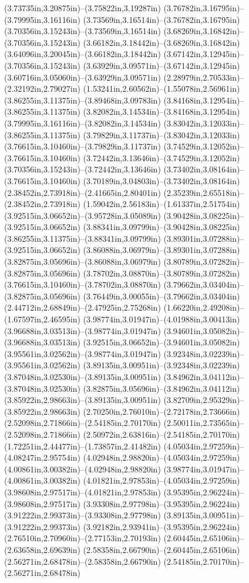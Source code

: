 (3.73735in,3.20875in)--(3.75822in,3.19287in) (3.76782in,3.16795in)--(3.79995in,3.16116in) (3.73569in,3.16514in)--(3.76782in,3.16795in) (3.70356in,3.15243in)--(3.73569in,3.16514in) (3.68269in,3.16842in)--(3.70356in,3.15243in) (3.66182in,3.18442in)--(3.68269in,3.16842in) (3.64096in,3.20045in)--(3.66182in,3.18442in) (3.67142in,3.12945in)--(3.70356in,3.15243in) (3.63929in,3.09571in)--(3.67142in,3.12945in) (3.60716in,3.05060in)--(3.63929in,3.09571in) (2.28979in,2.70533in)--(2.32192in,2.79027in) (1.53241in,2.60562in)--(1.55078in,2.56961in) (3.86255in,3.11375in)--(3.89468in,3.09783in) (3.84168in,3.12954in)--(3.86255in,3.11375in) (3.82082in,3.14534in)--(3.84168in,3.12954in) (3.79995in,3.16116in)--(3.82082in,3.14534in) (3.83042in,3.12033in)--(3.86255in,3.11375in) (3.79829in,3.11737in)--(3.83042in,3.12033in) (3.76615in,3.10460in)--(3.79829in,3.11737in) (3.74529in,3.12052in)--(3.76615in,3.10460in) (3.72442in,3.13646in)--(3.74529in,3.12052in) (3.70356in,3.15243in)--(3.72442in,3.13646in) (3.73402in,3.08164in)--(3.76615in,3.10460in) (3.70189in,3.04803in)--(3.73402in,3.08164in) (2.38452in,2.73918in)--(2.41665in,2.80401in) (2.35239in,2.65518in)--(2.38452in,2.73918in) (1.59042in,2.56183in)--(1.61337in,2.51754in) (3.92515in,3.06652in)--(3.95728in,3.05089in) (3.90428in,3.08225in)--(3.92515in,3.06652in) (3.88341in,3.09799in)--(3.90428in,3.08225in) (3.86255in,3.11375in)--(3.88341in,3.09799in) (3.89301in,3.07288in)--(3.92515in,3.06652in) (3.86088in,3.06979in)--(3.89301in,3.07288in) (3.82875in,3.05696in)--(3.86088in,3.06979in) (3.80789in,3.07282in)--(3.82875in,3.05696in) (3.78702in,3.08870in)--(3.80789in,3.07282in) (3.76615in,3.10460in)--(3.78702in,3.08870in) (3.79662in,3.03404in)--(3.82875in,3.05696in) (3.76449in,3.00055in)--(3.79662in,3.03404in) (2.44712in,2.68849in)--(2.47925in,2.75268in) (1.66220in,2.49208in)--(1.67597in,2.46595in) (3.98774in,3.01947in)--(4.01988in,3.00413in) (3.96688in,3.03513in)--(3.98774in,3.01947in) (3.94601in,3.05082in)--(3.96688in,3.03513in) (3.92515in,3.06652in)--(3.94601in,3.05082in) (3.95561in,3.02562in)--(3.98774in,3.01947in) (3.92348in,3.02239in)--(3.95561in,3.02562in) (3.89135in,3.00951in)--(3.92348in,3.02239in) (3.87048in,3.02530in)--(3.89135in,3.00951in) (3.84962in,3.04112in)--(3.87048in,3.02530in) (3.82875in,3.05696in)--(3.84962in,3.04112in) (3.85922in,2.98663in)--(3.89135in,3.00951in) (3.82709in,2.95329in)--(3.85922in,2.98663in) (2.70250in,2.76010in)--(2.72178in,2.73666in) (2.52098in,2.71866in)--(2.54185in,2.70170in) (2.50011in,2.73565in)--(2.52098in,2.71866in) (2.50972in,2.63816in)--(2.54185in,2.70170in) (1.72251in,2.44477in)--(1.73857in,2.41482in) (4.05034in,2.97259in)--(4.08247in,2.95754in) (4.02948in,2.98820in)--(4.05034in,2.97259in) (4.00861in,3.00382in)--(4.02948in,2.98820in) (3.98774in,3.01947in)--(4.00861in,3.00382in) (4.01821in,2.97853in)--(4.05034in,2.97259in) (3.98608in,2.97517in)--(4.01821in,2.97853in) (3.95395in,2.96224in)--(3.98608in,2.97517in) (3.93308in,2.97798in)--(3.95395in,2.96224in) (3.91222in,2.99373in)--(3.93308in,2.97798in) (3.89135in,3.00951in)--(3.91222in,2.99373in) (3.92182in,2.93941in)--(3.95395in,2.96224in) (2.76510in,2.70960in)--(2.77153in,2.70193in) (2.60445in,2.65106in)--(2.63658in,2.69639in) (2.58358in,2.66790in)--(2.60445in,2.65106in) (2.56271in,2.68478in)--(2.58358in,2.66790in) (2.54185in,2.70170in)--(2.56271in,2.68478in) 